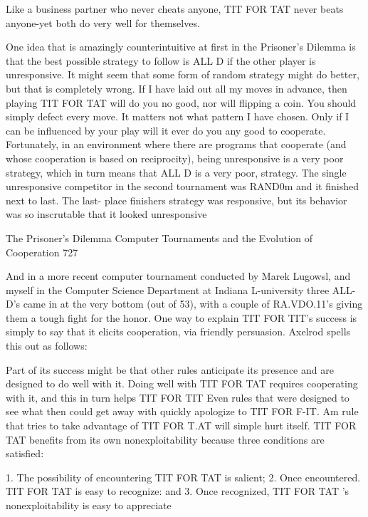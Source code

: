 Like a business partner who never cheats anyone, TIT FOR TAT never beats anyone-yet
both do very well for themselves.

        One idea that is amazingly counterintuitive at first in the Prisoner's Dilemma is
that the best possible strategy to follow is ALL D if the other player is unresponsive. It
might seem that some form of random strategy might do better, but that is completely
wrong. If I have laid out all my moves in advance, then playing TIT FOR TAT will do
you no good, nor will flipping a coin. You should simply defect every move. It matters
not what pattern I have chosen. Only if I can be influenced by your play will it ever do
you any good to cooperate.
        Fortunately, in an environment where there are programs that cooperate (and
whose cooperation is based on reciprocity), being unresponsive is a very poor strategy,
which in turn means that ALL D is a very poor, strategy. The single unresponsive
competitor in the second tournament was RAND0m and it finished next to last. The last-
place finishers strategy was responsive, but its behavior was so inscrutable that it looked
unresponsive




The Prisoner's Dilemma Computer Tournaments and the Evolution of Cooperation                     727

And in a more recent computer tournament conducted by Marek Lugowsl, and myself in
the Computer Science Department at Indiana L-university three ALL-D's came in at the
very bottom (out of 53), with a couple of RA.VDO.11's giving them a tough fight for the
honor.
       One way to explain TIT FOR TIT's success is simply to say that it elicits
cooperation, via friendly persuasion. Axelrod spells this out as follows:

        Part of its success might be that other rules anticipate its presence and are
designed to do well with it. Doing well with TIT FOR TAT requires cooperating with it,
and this in turn helps TIT FOR TIT Even rules that were designed to see what then could
get away with quickly apologize to TIT FOR F-IT. Am rule that tries to take advantage of
TIT FOR T.AT will simple hurt itself. TIT FOR TAT benefits from its own
nonexploitability because three conditions are satisfied:

       1. The possibility of encountering TIT FOR TAT is salient;
       2. Once encountered. TIT FOR TAT is easy to recognize: and
       3. Once recognized, TIT FOR TAT 's nonexploitability is easy to appreciate

